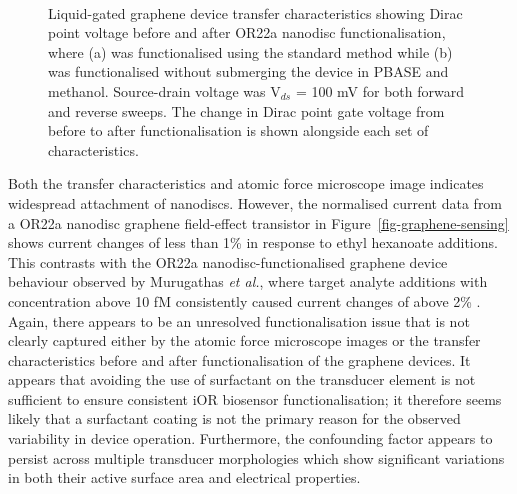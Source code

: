 \documentclass[
  a4paper,
]{scrbook}
\begin{document}
\begin{figure}
\begin{minipage}[t]{0.45\linewidth}
{{}

}

\end{minipage}%
%
\begin{minipage}[t]{0.01\linewidth}

{\centering 

~

}

\end{minipage}%

\caption[Liquid-gated graphene device transfer characteristics showing
Dirac point voltage before and after OR22a nanodisc functionalisation
with or without the use of PBASE and
methanol.]{\label{fig-graphene-sensing-TX}Liquid-gated graphene device
transfer characteristics showing Dirac point voltage before and after
OR22a nanodisc functionalisation, where (a) was functionalised using the
standard method while (b) was functionalised without submerging the
device in PBASE and methanol. Source-drain voltage was V\(_{ds}\) = 100
mV for both forward and reverse sweeps. The change in Dirac point gate
voltage from before to after functionalisation is shown alongside each
set of characteristics.}

\end{figure}

Both the transfer characteristics and atomic force microscope image
indicates widespread attachment of nanodiscs. However, the normalised
current data from a OR22a nanodisc graphene field-effect transistor in
Figure~\ref{fig-graphene-sensing} shows current changes of less than 1\%
in response to ethyl hexanoate additions. This contrasts with the OR22a
nanodisc-functionalised graphene device behaviour observed by Murugathas
\emph{et al.}, where target analyte additions with concentration above
10 fM consistently caused current changes of above 2\%
\autocite{Murugathas2020}. Again, there appears to be an unresolved
functionalisation issue that is not clearly captured either by the
atomic force microscope images or the transfer characteristics before
and after functionalisation of the graphene devices. It appears that
avoiding the use of surfactant on the transducer element is not
sufficient to ensure consistent iOR biosensor functionalisation; it
therefore seems likely that a surfactant coating is not the primary
reason for the observed variability in device operation. Furthermore,
the confounding factor appears to persist across multiple transducer
morphologies which show significant variations in both their active
surface area and electrical properties.
\end{document}

